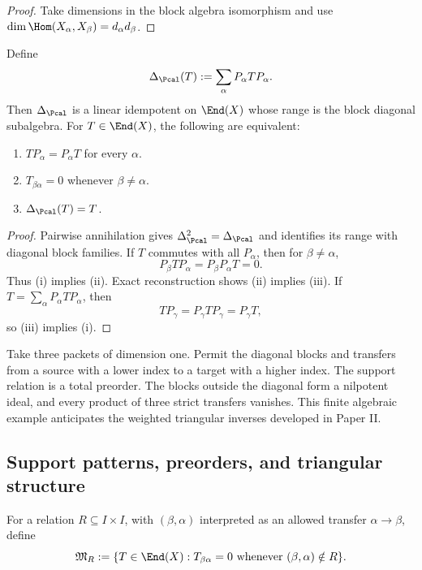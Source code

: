 \begin{proof}
Take dimensions in the block algebra isomorphism and use $\dim\Hom(X_\alpha,X_\beta)=d_\alpha d_\beta$.
\end{proof}

\begin{proposition}
\label{prop:block-diagonal-projection}
Define
\[
\Delta_{\Pcal}(T):=\sum_{\alpha}P_\alpha TP_\alpha.
\]
Then $\Delta_{\Pcal}$ is a linear idempotent on $\End(X)$ whose range is the block diagonal subalgebra.  For $T\in\End(X)$, the following are equivalent:
\begin{enumerate}[label=(\roman*)]
\item $TP_\alpha=P_\alpha T$ for every $\alpha$.
\item $T_{\beta\alpha}=0$ whenever $\beta\neq\alpha$.
\item $\Delta_{\Pcal}(T)=T$.
\end{enumerate}
\end{proposition}

\begin{proof}
Pairwise annihilation gives $\Delta_{\Pcal}^2=\Delta_{\Pcal}$ and identifies its range with diagonal block families.  If $T$ commutes with all $P_\alpha$, then for $\beta\neq\alpha$,
\[
P_\beta TP_\alpha=P_\beta P_\alpha T=0.
\]
Thus (i) implies (ii).  Exact reconstruction shows (ii) implies (iii).  If $T=\sum_\alpha P_\alpha TP_\alpha$, then
\[
TP_\gamma=P_\gamma TP_\gamma=P_\gamma T,
\]
so (iii) implies (i).
\end{proof}

\begin{microexample}[title={Lower triangular support}]
Take three packets of dimension one.  Permit the diagonal blocks and transfers from a source with a lower index to a target with a higher index.  The support relation is a total preorder.  The blocks outside the diagonal form a nilpotent ideal, and every product of three strict transfers vanishes.  This finite algebraic example anticipates the weighted triangular inverses developed in Paper II.
\end{microexample}


\subsection{Support patterns, preorders, and triangular structure}
\begin{definition}
\label{def:support-relation}
For a relation $R\subseteq I\times I$, with $(\beta,\alpha)$ interpreted as an allowed transfer $\alpha\to\beta$, define
\[
\mathfrak M_R
:=
\{T\in\End(X):T_{\beta\alpha}=0\text{ whenever }(\beta,\alpha)\notin R\}.
\]
\end{definition}

